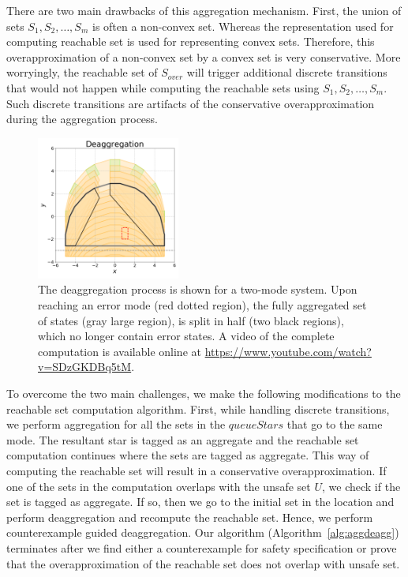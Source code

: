 There are two main drawbacks of this aggregation mechanism. 
%
First, the union of sets $S_1, S_2, \ldots, S_m$ is often a non-convex set. 
%
Whereas the representation used for computing reachable set is used for representing convex sets. 
%
Therefore, this overapproximation of a non-convex set by a convex set is very conservative.
%
More worryingly, the reachable set of $S_{over}$ will trigger additional discrete transitions that would not happen while computing the reachable sets using $S_1, S_2, \ldots, S_m$.
%
Such discrete transitions are artifacts of the conservative overapproximation during the aggregation process.



\begin{figure}
\centerline{\includegraphics[width=0.42\textwidth]{images/deagg.png}}
\caption{The deaggregation process is shown for a two-mode system. Upon reaching an error mode (red dotted region), the fully aggregated set of states (gray large region), is split in half (two black regions), which no longer contain error states. A video of the complete computation is available online at \url{https://www.youtube.com/watch?v=SDzGKDBq5tM}.}
\label{fig:deaggexample}
\end{figure}
%
To overcome the two main challenges, we make the following modifications to the reachable set computation algorithm.
First, while handling discrete transitions, we perform aggregation for all the sets in the $queueStars$ that go to the same mode. 
%
The resultant star is tagged as an \textsf{aggregate} and the reachable set computation continues where the sets are tagged as \textsf{aggregate}. 
%
This way of computing the reachable set will result in a conservative overapproximation.
%
If one of the sets in the computation overlaps with the unsafe set $U$, we check if the set is tagged as \textsf{aggregate}.
%
If so, then we go to the initial set in the location and perform deaggregation and recompute the reachable set.
%
Hence, we perform counterexample guided deaggregation.
%
Our algorithm (Algorithm~\ref{alg:aggdeagg}) terminates after we find either a counterexample for safety specification or prove that the overapproximation of the reachable set does not overlap with unsafe set. 
%



